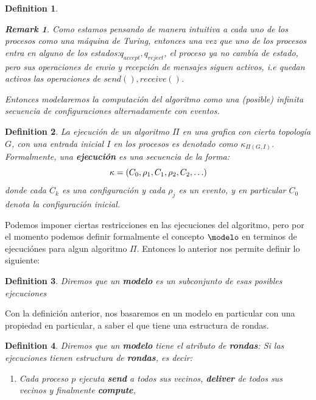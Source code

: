\documentclass[10pt]{report}
\newtheorem*{remark}{Remark}
\newtheorem{definition}{Definition}
\begin{document}
{\begin{definition}
        \begin{remark}
            Como estamos pensando de manera intuitiva a cada uno de los procesos como una máquina de Turing, entonces
            una vez que uno de los procesos entra en alguno de los estados:\space $q_{accept},q_{reject}$, el proceso ya no cambía
            de estado, pero sus operaciones de envio y recepción de mensajes siguen activos, i.e quedan activos las
            operaciones de $send(),receive()$.
        \end{remark}
        \newline
        Entonces modelaremos la computación del algoritmo como una (posible) infinita secuencia de configuraciones
        alternadamente con eventos.
    \end{definition}
    \theoremstyle{definition}
    \begin{definition}
        La ejecución de un algoritmo $\Pi$ en una grafica con cierta topología
        $G$, con una entrada inicial $I$ en los procesos es denotado como $\kappa_{\Pi(G,I)}$.
        Formalmente, una \textbf{ejecución} es una secuencia de la forma:
        \begin{equation}
            \kappa = (C_{0},\rho_{1},C_{1},\rho_{2},C_{2},\mathellipsis)\label{eq:equation3}
        \end{equation}
        donde cada $C_{k}$ es una configuración y cada $\rho_{j}$ es un evento,
        y en particular $C_{0}$ denota la configuración inicial.
    \end{definition}
    Podemos imponer ciertas restricciones en las ejecuciones del algoritmo, pero por el momento
    podemos definir formalmente el concepto $\modelo$ en terminos de ejecuciónes para algun algoritmo
    $\Pi$.\newline
    Entonces lo anterior nos permite definir lo siguiente:
    \begin{definition}
        Diremos que un \textbf{modelo} es un subconjunto de esas posibles ejecuciones
    \end{definition}
    Con la definición anterior, nos basaremos en un modelo en particular con una propiedad en particular, a saber el que
    tiene una estructura de rondas.\newline
    \begin{definition}
        Diremos que un \textbf{modelo} tiene el atributo de \textbf{rondas}:
        Si las ejecuciones tienen estructura de \textbf{rondas}, es decir:
        \begin{enumerate}
            \item Cada proceso $p$ ejecuta \textbf{send} a todos sus vecinos, \textbf{deliver} de todos sus vecinos y finalmente \textbf{compute},

\end{enumerate}
\end{definition}}
\end{document}
